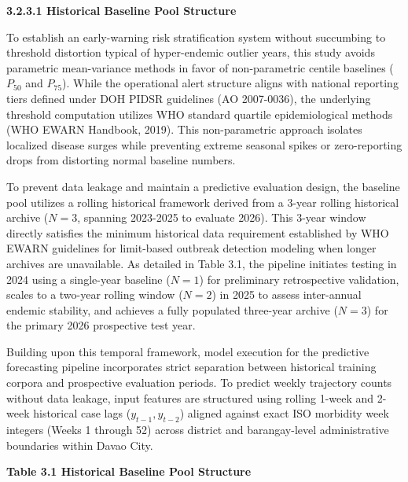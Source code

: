 \documentclass[
]{article}
\begin{document}
\textbf{3.2.3.1 Historical Baseline Pool Structure}

To establish an early-warning risk stratification system without
succumbing to threshold distortion typical of hyper-endemic outlier
years, this study avoids parametric mean-variance methods in favor of
non-parametric centile baselines (\(P_{50}\) and \(P_{75}\)). While the
operational alert structure aligns with national reporting tiers defined
under DOH PIDSR guidelines (AO 2007-0036), the underlying threshold
computation utilizes WHO standard quartile epidemiological methods (WHO
EWARN Handbook, 2019). This non-parametric approach isolates localized
disease surges while preventing extreme seasonal spikes or
zero-reporting drops from distorting normal baseline numbers.

To prevent data leakage and maintain a predictive evaluation design, the
baseline pool utilizes a rolling historical framework derived from a
3-year rolling historical archive (\(N = 3\), spanning 2023-2025 to
evaluate 2026). This 3-year window directly satisfies the minimum
historical data requirement established by WHO EWARN guidelines for
limit-based outbreak detection modeling when longer archives are
unavailable. As detailed in Table 3.1, the pipeline initiates testing in
2024 using a single-year baseline (\(N = 1\)) for preliminary
retrospective validation, scales to a two-year rolling window
(\(N = 2\)) in 2025 to assess inter-annual endemic stability, and
achieves a fully populated three-year archive (\(N = 3\)) for the
primary 2026 prospective test year.

Building upon this temporal framework, model execution for the
predictive forecasting pipeline incorporates strict separation between
historical training corpora and prospective evaluation periods. To
predict weekly trajectory counts without data leakage, input features
are structured using rolling 1-week and 2-week historical case lags
(\(y_{t - 1},y_{t - 2}\)) aligned against exact ISO morbidity week
integers (Weeks 1 through 52) across district and barangay-level
administrative boundaries within Davao City.

\textbf{Table 3.1 Historical Baseline Pool Structure}
\end{document}
